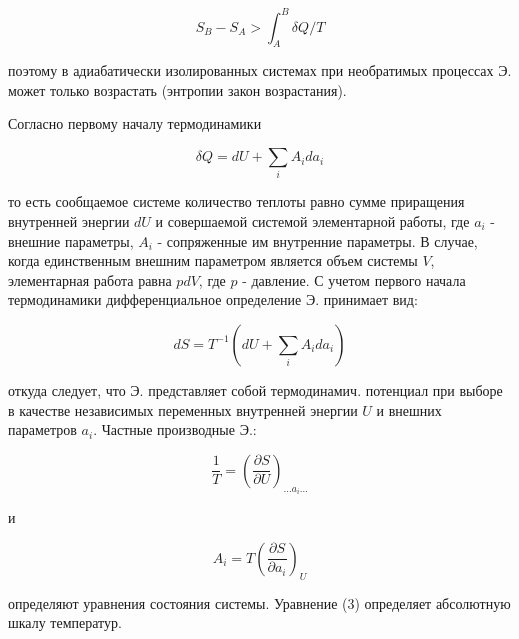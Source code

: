 \documentclass[10pt]{article}
\begin{document}
\[

S_{B}-S_{A}>\int_{A}^{B} \delta Q / T

\]



поэтому в адиабатически изолированных системах при необратимых процессах Э. может только возрастать (энтропии закон возрастания).



Согласно первому началу термодинамики



\[

\delta Q=d U+\sum_{i} A_{i} d a_{i}

\]



то есть сообщаемое системе количество теплоты равно сумме приращения внутренней энергии $d U$ и совершаемой системой элементарной работы, где $a_{i}$ - внешние параметры, $A_{i}$ - сопряженные им внутренние параметры. В случае, когда единственным внешним параметром является объем системы $V$, элементарная работа равна $p d V$, где $p$ - давление. С учетом первого начала термодинамики дифференциальное определение Э. принимает вид:



\[

d S=T^{-1}\left(d U+\sum_{i} A_{i} d a_{i}\right)

\]



откуда следует, что Э. представляет собой термодинамич. потенциал при выборе в качестве независимых переменных внутренней энергии $U$ и внешних параметров $a_{i}$. Частные производные $Э .:$



\[

\frac{1}{T}=\left(\frac{\partial S}{\partial U}\right)_{\ldots a_{i} \ldots}

\]



и



\[

A_{i}=T\left(\frac{\partial S}{\partial a_{i}}\right)_{U}

\]



определяют уравнения состояния системы. Уравнение (3) определяет абсолютную шкалу температур.
\end{document}
